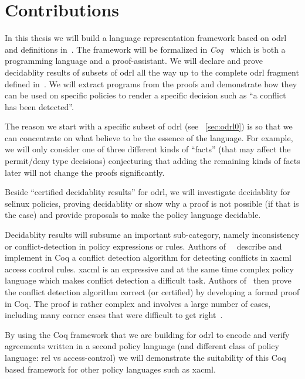 \section{Contributions}

In this thesis we will build a language representation framework based on \ac{odrl} and definitions in~\cite{pucella2006}. The framework will be formalized in \emph{Coq}~\cite{BC04} which is both a programming language and a proof-assistant. We will declare and prove decidablity results of subsets of \ac{odrl} all the way up to the complete \ac{odrl} fragment defined in~\cite{pucella2006}. We will extract programs from the proofs and demonstrate how they can be used on specific policies to render a specific decision such as ``a conflict has been detected''. 

The reason we start with a specific subset of \ac{odrl} (see ~\ref{sec:odrl0}) is so that we can concentrate on what believe to be the essence of the language. For example, we will only consider one of three different kinds of ``facts'' (that may affect the permit/deny type decisions) conjecturing that adding the remaining kinds of facts later will not change the proofs significantly.

Beside ``certified decidablity results'' for \ac{odrl}, we will investigate decidablity for \ac{selinux} policies, proving decidablity or show why a proof is not possible (if that is the case) and provide proposals to make the policy language decidable.

Decidablity results will subsume an important sub-category, namely inconsistency or conflict-detection in policy expressions or rules. Authors of~\cite{st2012verified}~\cite{felty13} describe and implement in Coq a conflict detection algorithm for detecting conflicts in \ac{xacml} access control rules. \ac{xacml} is an expressive and at the same time complex policy language which makes conflict detection a difficult task. Authors of~\cite{st2012verified} then prove the conflict detection algorithm correct (or certified) by developing a formal proof in Coq. The proof is rather complex and involves a large number of cases, including many
corner cases that were difficult to get right~\cite{st2012verified}. 

By using the Coq framework that we are building for \ac{odrl} to encode and verify agreements written in a second policy language (and different class of policy language: \ac{rel} vs access-control) we will demonstrate the suitability of this Coq based framework for other policy languages such as \ac{xacml}. 

